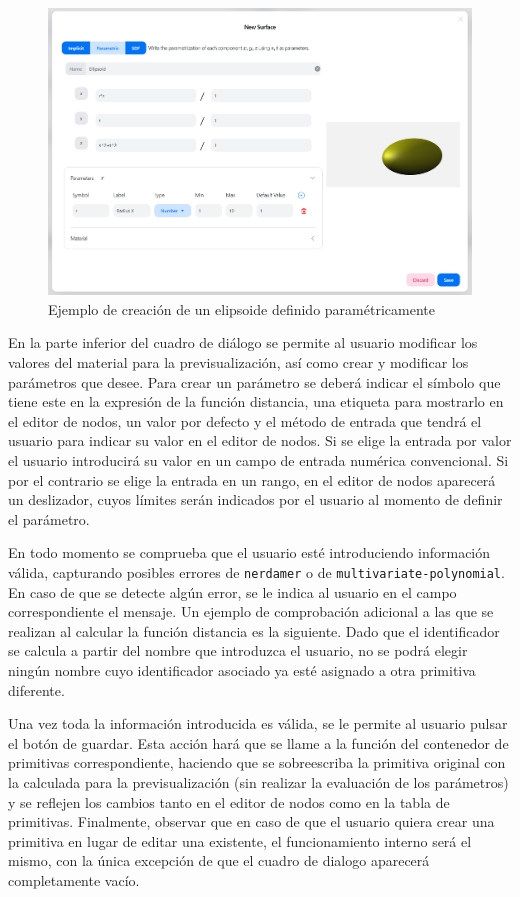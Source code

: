 \begin{figure}[ht!]
    \centering
    \includegraphics[width=\textwidth]{Plantilla-TFG-master/img/ejemploParam.png}
    \caption{Ejemplo de creación de un elipsoide definido paramétricamente}
\end{figure}

En la parte inferior del cuadro de diálogo se permite al usuario modificar los valores del material para la previsualización, así como crear y modificar los parámetros que desee. Para crear un parámetro se deberá indicar el símbolo que tiene este en la expresión de la función distancia, una etiqueta para mostrarlo en el editor de nodos, un valor por defecto y el método de entrada que tendrá el usuario para indicar  su valor en el editor de nodos. Si se elige la entrada por valor el usuario introducirá su valor en un campo de entrada numérica convencional. Si por el contrario se elige la entrada en un rango, en el editor de nodos aparecerá un deslizador, cuyos límites serán indicados por el usuario al momento de definir el parámetro.\newline

En todo momento se comprueba que el usuario esté introduciendo información válida, capturando posibles errores de \texttt{nerdamer} o de \texttt{multivariate-polynomial}. En caso de que se detecte algún error, se le indica al usuario en el campo correspondiente el mensaje. Un ejemplo de comprobación adicional a las que se realizan al calcular la función distancia es la siguiente. Dado que el identificador se calcula a partir del nombre que introduzca el usuario, no se podrá elegir ningún nombre cuyo identificador asociado ya esté asignado a otra primitiva diferente.\newline

Una vez toda la información introducida es válida, se le permite al usuario pulsar el botón de guardar. Esta acción hará que se llame a la función del contenedor de primitivas correspondiente, haciendo que se sobreescriba la primitiva original con la calculada para la previsualización (sin realizar la evaluación de los parámetros) y se reflejen los cambios tanto en el editor de nodos como en la tabla de primitivas. Finalmente, observar que en caso de que el usuario quiera crear una primitiva en lugar de editar una existente, el funcionamiento interno será el mismo, con la única excepción de que el cuadro de dialogo aparecerá completamente vacío.

